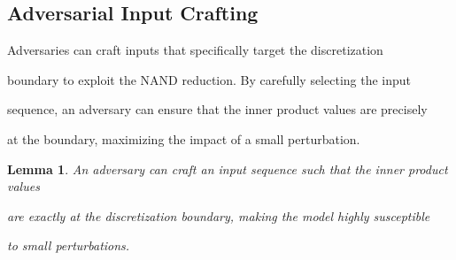 \documentclass[11pt]{article}
\newtheorem{lemma}[theorem]{Lemma}
\theoremstyle{definition}
\begin{document}
\subsection{Adversarial Input Crafting}













Adversaries can craft inputs that specifically target the discretization






boundary to exploit the NAND reduction. By carefully selecting the input






sequence, an adversary can ensure that the inner product values are precisely






at the boundary, maximizing the impact of a small perturbation.













\begin{lemma}






An adversary can craft an input sequence such that the inner product values






are exactly at the discretization boundary, making the model highly susceptible






to small perturbations.






\end{lemma}
\end{document}
